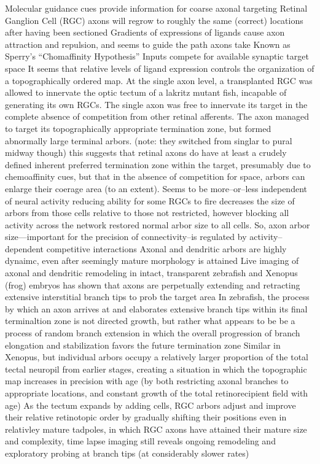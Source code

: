 \documentclass[11pt, a4paper, oneside]{article}   	%
\begin{document}
\begin{outline}
 \point Molecular guidance cues provide information for coarse axonal targeting 
    \subpoint Retinal Ganglion Cell (RGC) axons will regrow to roughly the same (correct) locations after having been sectioned
    \subpoint Gradients of expressions of ligands cause axon attraction and repulsion, and seems to guide the path axons take
        \subsubpoint Known as Sperry's ``Chomaffinity Hypothesis''
 \point Inputs compete for available synaptic target space
    \subpoint It seems that relative levels of ligand expression controls the organization of a topographically ordered map.
    \subpoint At the single axon level, a transplanted RGC was allowed to innervate the optic tectum of a lakritz mutant fish, incapable of generating its own RGCs. The single axon was free to innervate its target in the complete absence of competition from other retinal afferents. The axon managed to target its topographically appropriate termination zone, but formed abnormally large terminal arbors. (note: they switched from singlar to pural midway though)
        \subsubpoint this suggests that retinal axons do have at least a crudely defined inherent preferred termination zone within the target, presumably due to chemoaffinity cues, but that in the absence of competition for space, arbors can enlarge their coerage area (to an extent).
    \subpoint Seems to be more--or--less independent of neural activity 
        \subsubpoint reducing ability for some RGCs to fire decreases the size of arbors from those cells relative to those not restricted, however blocking all activity across the network restored normal arbor size to all cells.
            \supersubpoint So, axon arbor size---important for the precision of connectivity--is regulated by activity--dependent competitive interactions
 \point Axonal and dendritic arbors are highly dynaimc, even after seemingly mature morphology is attained
    \subpoint Live imaging of axonal and dendritic remodeling in intact, transparent zebrafish and Xenopus (frog) embryos has shown that axons are perpetually extending and retracting extensive interstitial branch tips to prob the target area
    \subpoint In zebrafish, the process by which an axon arrives at and elaborates extensive branch tips within its final terminaltion zone is not directed growth, but rather what appears to be be a process of random branch extension in which the overall progression of branch elongation and stabilization favors the future termination zone
    \subpoint Similar in Xenopus, but individual arbors occupy a relatively larger proportion of the total tectal neuropil from earlier stages, creating a situation in which the topographic map increases in precision with age (by both restricting axonal branches to appropriate locations, and constant growth of the total retinorecipient field with age)
    \subpoint As the tectum expands by adding cells, RGC arbors adjust and improve their relative retinotopic order by gradually shifting their positions
    \subpoint even in relativley mature tadpoles, in which RGC axons have attained their mature size and complexity, time lapse imaging still reveals ongoing remodeling and exploratory probing at branch tips (at considerably slower rates)



\end{outline}
\end{document}

